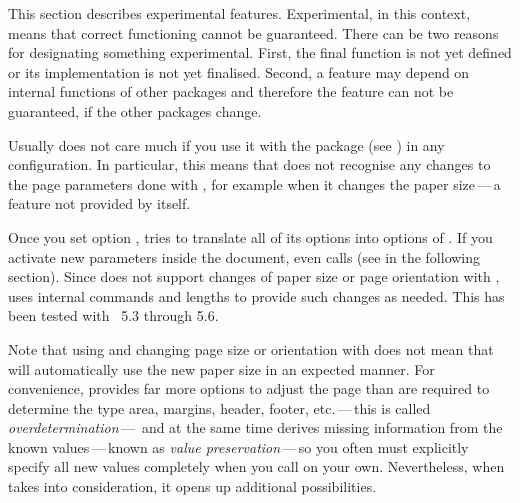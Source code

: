 This section describes experimental features. Experimental, in this context,
means that correct functioning cannot be guaranteed. There can be two reasons
for designating something experimental. First, the final function is not yet
defined or its implementation is not yet finalised. Second, a feature may
depend on internal functions of other packages and therefore the feature can
not be guaranteed, if the other packages change.

\begin{Declaration}
\end{Declaration}
Usually  does not care much if you use it with the
 package (see
\cite{package:geometry}) in any configuration. In particular, this means that
 does not recognise any changes to the page parameters done
with , for example when it changes the paper size\,---\,a
feature not provided by  itself.

Once you set option ,
 tries to translate all of its options into options of
. If you activate new parameters inside the document,
 even calls  (see
 in the following section). Since
 does not support changes of paper size or page orientation
with ,  uses internal commands and
 lengths to provide such changes as needed. This has been
tested with ~5.3 through 5.6.

Note that using  and changing page size or orientation with
 does not mean that  will automatically
use the new paper size in an expected manner. For convenience,
 provides far more options to adjust the page than are
required to determine the type area, margins, header, footer, etc.\,---\,this
is called \emph{overdetermination}\,---\, and at the same time
 derives missing information from the known
values\,---\,known as \emph{value preservation}\,---\,so you often must
explicitly specify all new values completely when you call 
on your own. Nevertheless, when  takes 
into consideration, it opens up additional possibilities.%
\EndIndexGroup


